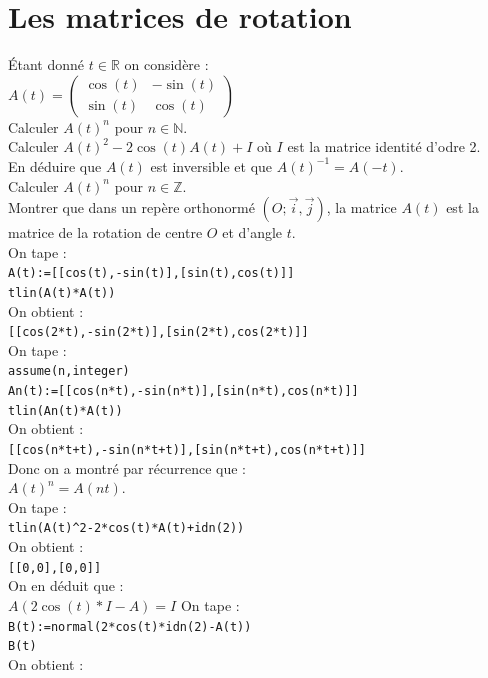 \documentclass[a4paper,11pt]{book}
\newcommand{\R}{{\mathbb{R}}}
\newcommand{\Z}{{\mathbb{Z}}}
\newcommand{\N}{{\mathbb{N}}}
\begin{document}
\section{Les matrices de rotation}
\'Etant donn\'e $t\in \R$ on consid\`ere :\\
$A(t)=\left(
\begin{array}{cc}
  \cos(t)&-\sin(t)\\
  \sin(t)&\cos(t)
\end{array}
\right)$\\
Calculer $A(t)^n$ pour $n\in \N$.\\
Calculer $A(t)^2-2\cos(t)A(t)+I$ o\`u $I$ est la matrice identit\'e d'odre 2.\\
En d\'eduire que $A(t)$ est inversible et que $A(t)^{-1}=A(-t)$.\\
Calculer $A(t)^n$ pour $n\in \Z$.\\
Montrer que dans un rep\`ere orthonorm\'e $(O;\overrightarrow i,\overrightarrow j)$, la matrice $A(t)$ est la matrice de la rotation de centre $O$ et d'angle $t$.\\
On tape :\\
{\tt A(t):=[[cos(t),-sin(t)],[sin(t),cos(t)]]}\\
{\tt tlin(A(t)*A(t))}\\
On obtient :\\
{\tt [[cos(2*t),-sin(2*t)],[sin(2*t),cos(2*t)]]}\\
On tape :\\
{\tt assume(n,integer)}\\
{\tt An(t):=[[cos(n*t),-sin(n*t)],[sin(n*t),cos(n*t)]]}\\
{\tt tlin(An(t)*A(t))}\\
On obtient :\\
{\tt [[cos(n*t+t),-sin(n*t+t)],[sin(n*t+t),cos(n*t+t)]]}\\
Donc on a montr\'e par r\'ecurrence que :\\
$A(t)^n=A(nt)$.\\
On tape :\\
{\tt tlin(A(t)\verb|^|2-2*cos(t)*A(t)+idn(2))}\\
On obtient :\\
{\tt [[0,0],[0,0]]}\\
On en d\'eduit que :\\
$A(2\cos(t)*I-A)=I$
On tape :\\
{\tt B(t):=normal(2*cos(t)*idn(2)-A(t))}\\
{\tt B(t)}\\
On obtient :\\
\end{document}
